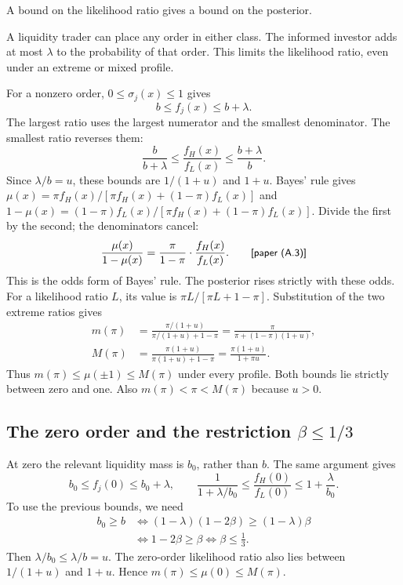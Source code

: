 A bound on the likelihood ratio gives a bound on the posterior.

\begin{intuition}
A liquidity trader can place any order in either class.
The informed investor adds at most $\lambda$ to the probability of that order.
This limits the likelihood ratio, even under an extreme or mixed profile.
\end{intuition}

For a nonzero order, $0\le\sigma_j(x)\le1$ gives
\[
b\le f_j(x)\le b+\lambda.
\]
The largest ratio uses the largest numerator and the smallest denominator.
The smallest ratio reverses them:
\[
\frac{b}{b+\lambda}\le\frac{f_H(x)}{f_L(x)}\le\frac{b+\lambda}{b}.
\]
Since $\lambda/b=u$, these bounds are $1/(1+u)$ and $1+u$.
Bayes' rule gives $\mu(x)=\pi f_H(x)/[\pi f_H(x)+(1-\pi)f_L(x)]$ and $1-\mu(x)=(1-\pi)f_L(x)/[\pi f_H(x)+(1-\pi)f_L(x)]$.
Divide the first by the second; the denominators cancel:
\[
\frac{\mu(x)}{1-\mu(x)}=\frac{\pi}{1-\pi}\cdot\frac{f_H(x)}{f_L(x)}.\tag*{\paper{(A.3)}}
\]
This is the odds form of Bayes' rule.
The posterior rises strictly with these odds.
For a likelihood ratio $L$, its value is $\pi L/[\pi L+1-\pi]$.
Substitution of the two extreme ratios gives
\begin{align*}
m(\pi)&=\frac{\pi/(1+u)}{\pi/(1+u)+1-\pi}
       =\frac{\pi}{\pi+(1-\pi)(1+u)},\\
M(\pi)&=\frac{\pi(1+u)}{\pi(1+u)+1-\pi}
       =\frac{\pi(1+u)}{1+\pi u}.
\end{align*}
Thus $m(\pi)\le\mu(\pm1)\le M(\pi)$ under every profile. 
Both bounds lie strictly between zero and one.
Also $m(\pi)<\pi<M(\pi)$ because $u>0$.

\subsection{The zero order and the restriction \texorpdfstring{$\beta\le1/3$}{beta <= 1/3}}
\label{sec:04_slot_beliefs-zero}

At zero the relevant liquidity mass is $b_0$, rather than $b$.
The same argument gives
\[
b_0\le f_j(0)\le b_0+\lambda,\qquad
\frac{1}{1+\lambda/b_0}\le\frac{f_H(0)}{f_L(0)}\le1+\frac{\lambda}{b_0}.
\]
To use the previous bounds, we need
\begin{align*}
b_0\ge b
&\iff (1-\lambda)(1-2\beta)\ge(1-\lambda)\beta\\
&\iff 1-2\beta\ge\beta
\iff \beta\le\frac13.
\end{align*}
Then $\lambda/b_0\le\lambda/b=u$.
The zero-order likelihood ratio also lies between $1/(1+u)$ and $1+u$.
Hence $m(\pi)\le\mu(0)\le M(\pi)$. 


